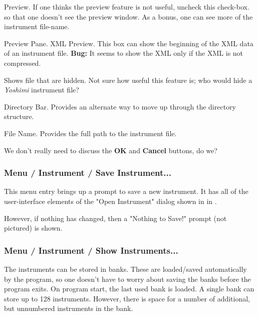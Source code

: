   Preview.
   If one thinks the preview feature is not useful, uncheck this check-box.
   so that one doesn't see the preview window.  As a bonus, one can see more
   of the instrument file-name.

   Preview Pane.
   XML Preview.
   This box can show the beginning of the XML data of an instrument file.
   \textbf{Bug:}
   It seems to show the XML only if the XML is not compressed.

   Shows file that are hidden.  Not sure how useful this feature is;
   who would hide a \textsl{Yoshimi} instrument file?

   Directory Bar.
   Provides an alternate way to move up through the directory structure.

   File Name.
   Provides the full path to the instrument file.

   We don't really need to discuss the \textbf{OK} and \textbf{Cancel}
   buttons, do we?

\subsubsection{Menu / Instrument / Save Instrument...}
\label{subsubsec:menu_instrument_save}

   This menu entry brings up a prompt to save a new instrument.
   It has all of the user-interface elements of the "Open Instrument"
   dialog shown in
   in .

   However, if nothing has changed, then a "Nothing to Save!" prompt (not
   pictured) is shown.

\subsubsection{Menu / Instrument / Show Instruments...}
\label{subsubsec:menu_instrument_show}

   The instruments can be stored in banks. These are loaded/saved
   automatically by the program, so one doesn't have to worry about saving the
   banks before the program exits. On program start, the last used bank is
   loaded. A single bank can store up to 128 instruments. 
   However, there is space for a number of additional, but unnumbered
   instruments in the bank.

